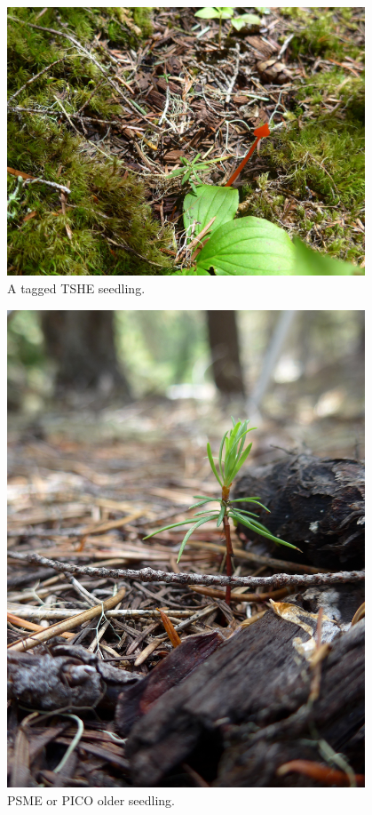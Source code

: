\documentclass[11pt,letter]{article}
\begin{document}
\begin{figure}[h!]
\centering
\includegraphics[width=0.95\textwidth]{images/2020June18_Rainier247smTSHE.jpg}
\caption{A tagged TSHE seedling.}
\label{fig:tshe} 
\end{figure}



\begin{figure}[h!]
\centering
\includegraphics[width=0.95\textwidth]{images/2020June17_Rainier206sm.jpg}
\caption{PSME or PICO older seedling.}
\label{fig:seedling} 
\end{figure}
\end{document}
